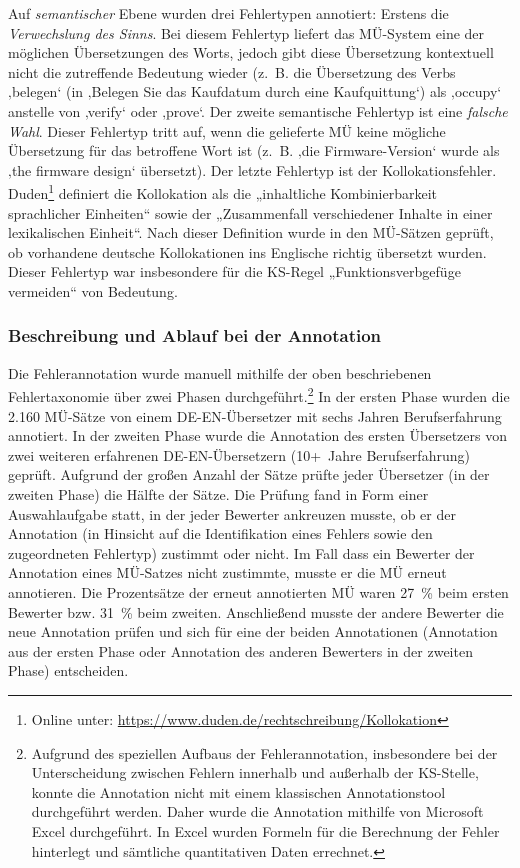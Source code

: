 Auf \textit{semantischer} Ebene wurden drei Fehlertypen annotiert: Erstens die \textit{Verwechslung des Sinns}. Bei diesem Fehlertyp liefert das MÜ-System eine der möglichen Übersetzungen des Worts, jedoch gibt diese Übersetzung kontextuell nicht die zutreffende Bedeutung wieder (z.~B. die Übersetzung des Verbs ‚belegen‘ (in ‚Belegen Sie das Kaufdatum durch eine Kaufquittung‘) als ‚occupy‘ anstelle von ‚verify‘ oder ‚prove‘. Der zweite semantische Fehlertyp ist eine \textit{falsche Wahl}. Dieser Fehlertyp tritt auf, wenn die gelieferte MÜ keine mögliche Übersetzung für das betroffene Wort ist (z.~B. ‚die Firmware-Version‘ wurde als ‚the firmware design‘ übersetzt). Der letzte Fehlertyp ist der Kollokationsfehler. Duden\footnote{Online unter: \url{https://www.duden.de/rechtschreibung/Kollokation}} definiert die Kollokation als die „inhaltliche Kombinierbarkeit sprachlicher Einheiten“ sowie der „Zusammenfall verschiedener Inhalte in einer lexikalischen Einheit“. Nach dieser Definition wurde in den MÜ-Sätzen geprüft, ob vorhandene deutsche Kollokationen ins Englische richtig übersetzt wurden. Dieser Fehlertyp war insbesondere für die KS-Regel „Funktionsverbgefüge vermeiden“ von Bedeutung.

\subsubsection{\label{sec:4.4.4.2} Beschreibung und Ablauf bei der Annotation}

Die Fehlerannotation wurde manuell mithilfe der oben beschriebenen Fehlertaxonomie über zwei Phasen durchgeführt.\footnote{{{{Aufgrund des speziellen Aufbaus der Fehlerannotation, insbesondere bei der Unterscheidung zwischen Fehlern innerhalb und außerhalb der KS-Stelle, konnte die Annotation nicht mit einem klassischen Annotationstool durchgeführt werden. Daher wurde die Annotation mithilfe von Microsoft Excel durchgeführt. In Excel wurden Formeln für die Berechnung der Fehler hinterlegt und sämtliche quantitativen Daten errechnet.}}}} In der ersten Phase wurden die 2.160 MÜ-Sätze von einem DE-EN-Übersetzer mit sechs Jahren Berufserfahrung annotiert. In der zweiten Phase wurde die Annotation des ersten Übersetzers von zwei weiteren erfahrenen DE-EN-Übersetzern (10+~Jahre Berufserfahrung) geprüft. Aufgrund der großen Anzahl der Sätze prüfte jeder Übersetzer (in der zweiten Phase) die Hälfte der Sätze. Die Prüfung fand in Form einer Auswahlaufgabe statt, in der jeder Bewerter ankreuzen musste, ob er der Annotation (in Hinsicht auf die Identifikation eines Fehlers sowie den zugeordneten Fehlertyp) zustimmt oder nicht. Im Fall dass ein Bewerter der Annotation eines MÜ-Satzes nicht zustimmte, musste er die MÜ erneut annotieren. Die Prozentsätze der erneut annotierten MÜ waren 27~\% beim ersten Bewerter bzw. 31~\% beim zweiten. Anschließend musste der andere Bewerter die neue Annotation prüfen und sich für eine der beiden Annotationen (Annotation aus der ersten Phase oder Annotation des anderen Bewerters in der zweiten Phase) entscheiden.

